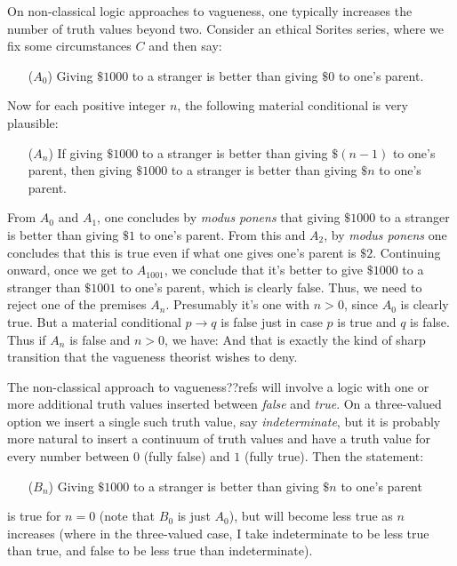 On non-classical logic approaches to vagueness, one typically increases the number of truth values beyond two. 
Consider an ethical Sorites
series, where we fix some circumstances $C$ and then say:
\begin{itemize}
\item[($A_0$)] Giving $ \$1000$ to a stranger is better than giving $ \$0$ to one's parent.
\end{itemize}

Now for each positive integer $n$, the following material conditional is very plausible:
\begin{itemize}
\item[($A_n$)] If giving $ \$1000$ to a stranger is better than giving $ \$(n-1)$ to one's parent, then giving  $ \$1000$ to a stranger is 
    better than giving $ \$n$ to one's parent.
\end{itemize}

From $A_0$ and $A_1$, one concludes by \textit{modus ponens} that giving $ \$1000$ to a stranger is better than giving $ \$1$ to one's parent.
From this and $A_2$, by \textit{modus ponens} one concludes that this is true even if what one gives one's parent is $ \$2$. Continuing onward,
once we get to $A_{1001}$, we conclude that it's better to give $ \$1000$ to a stranger than $ \$1001$ to one's parent, which is clearly false. Thus,
we need to reject one of the premises $A_n$. Presumably it's one with $n>0$, since $A_0$ is clearly true. But a material conditional
$p\rightarrow q$ is false just in case $p$ is true and $q$ is false. Thus if $A_n$ is false and $n>0$, we have:
And that is exactly the kind of sharp transition that the vagueness theorist wishes to deny.

The non-classical approach to vagueness??refs will involve a logic with one or more additional truth values inserted
between \textit{false} and \textit{true}. On a three-valued option we insert a single such truth value, say 
\textit{indeterminate}, but it is probably more natural to insert a continuum of truth values and have a truth
value for every number between
$0$ (fully false) and $1$ (fully true).
 Then the statement:
\begin{itemize}
\item[($B_n$)] Giving $ \$1000$ to a stranger is better than giving $ \$n$ to one's parent 
\end{itemize}
is true for $n=0$ (note that $B_0$ is just $A_0$), but will become less true as $n$ increases (where in the
three-valued case, I take indeterminate to be less true than true, and false to be less true than indeterminate). 

